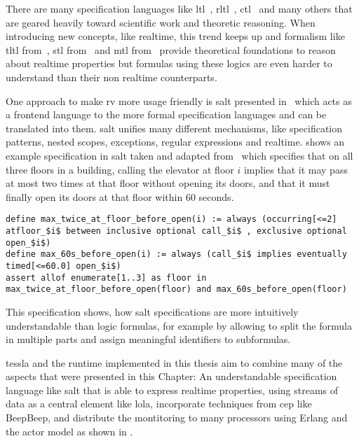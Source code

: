 There are many specification languages like \gls{ltl}~\citep{Pnueli77}, \gls{rltl}~\citep{Leucker2007}, \gls{ctl}~\citep{Clarke82} and many others that are geared heavily toward scientific work and theoretic reasoning.
When introducing new concepts, like realtime, this trend keeps up and formalism like \gls{tltl} from~\cite{Raskin1997}, \gls{stl} from~\cite{Maler2004} and \gls{mtl} from~\cite{Koymans1990} provide theoretical foundations to reason about realtime properties but formulas using these logics are even harder to understand than their non realtime counterparts.

One approach to make \gls{rv} more usage friendly is \gls{salt} presented in~\cite{Bauer2006} which acts as a frontend language to the more formal specification languages and can be translated into them.
\Gls{salt} unifies many different mechanisms, like specification patterns, nested scopes, exceptions, regular expressions and realtime.
 shows an example specification in \gls{salt} taken and adapted from~\cite{Dwyer1999} which specifies that on all three floors in a building, calling the elevator at floor \(\mathit{i}\) implies that it may pass at most two times at that floor without opening its doors, and that it must finally open its doors at that floor within 60 seconds.

\begin{lstlisting}[float,breaklines=true,label=listing:salt_example,caption={[Example \gls{salt} specification with realtime operators]An example specification in the \gls{salt} language taken from \cite{Bauer2006} defining behaviour of an elevator.}]
define max_twice_at_floor_before_open(i) := always (occurring[<=2] atfloor_$i$ between inclusive optional call_$i$ , exclusive optional open_$i$)
define max_60s_before_open(i) := always (call_$i$ implies eventually timed[<=60.0] open_$i$)
assert allof enumerate[1..3] as floor in max_twice_at_floor_before_open(floor) and max_60s_before_open(floor)
\end{lstlisting}

This specification shows, how \gls{salt} specifications are more intuitively understandable than logic formulas, for example by allowing to split the formula in multiple parts and assign meaningful identifiers to subformulas.

\Gls{tessla} and the runtime implemented in this thesis aim to combine many of the aspects that were presented in this Chapter: An understandable specification language like \gls{salt} that is able to express realtime properties, using streams of data as a central element like \gls{lola}, incorporate techniques from \gls{cep} like BeepBeep, and distribute the montitoring to many processors using Erlang and the actor model as shown in \cite{Attard2016}.

